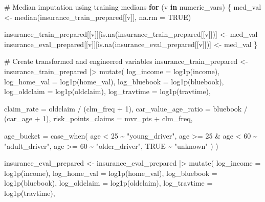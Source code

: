 \documentclass[
  11pt]{article}
\newenvironment{Shaded}{\begin{snugshade}}{\end{snugshade}}
\newcommand{\AttributeTok}[1]{\textcolor[rgb]{0.40,0.45,0.13}{#1}}
\newcommand{\CommentTok}[1]{\textcolor[rgb]{0.37,0.37,0.37}{#1}}
\newcommand{\ConstantTok}[1]{\textcolor[rgb]{0.56,0.35,0.01}{#1}}
\newcommand{\ControlFlowTok}[1]{\textcolor[rgb]{0.00,0.23,0.31}{\textbf{#1}}}
\newcommand{\DecValTok}[1]{\textcolor[rgb]{0.68,0.00,0.00}{#1}}
\newcommand{\FunctionTok}[1]{\textcolor[rgb]{0.28,0.35,0.67}{#1}}
\newcommand{\NormalTok}[1]{\textcolor[rgb]{0.00,0.23,0.31}{#1}}
\newcommand{\OtherTok}[1]{\textcolor[rgb]{0.00,0.23,0.31}{#1}}
\newcommand{\SpecialCharTok}[1]{\textcolor[rgb]{0.37,0.37,0.37}{#1}}
\newcommand{\StringTok}[1]{\textcolor[rgb]{0.13,0.47,0.30}{#1}}
\begin{document}
\begin{Shaded}
\begin{Highlighting}[]
\CommentTok{\# Median imputation using training medians}
\ControlFlowTok{for}\NormalTok{ (v }\ControlFlowTok{in}\NormalTok{ numeric\_vars) \{}
\NormalTok{  med\_val }\OtherTok{\textless{}{-}} \FunctionTok{median}\NormalTok{(insurance\_train\_prepared[[v]], }\AttributeTok{na.rm =} \ConstantTok{TRUE}\NormalTok{)}

\NormalTok{  insurance\_train\_prepared[[v]][}\FunctionTok{is.na}\NormalTok{(insurance\_train\_prepared[[v]])] }\OtherTok{\textless{}{-}}\NormalTok{ med\_val}
\NormalTok{  insurance\_eval\_prepared[[v]][}\FunctionTok{is.na}\NormalTok{(insurance\_eval\_prepared[[v]])] }\OtherTok{\textless{}{-}}\NormalTok{ med\_val}
\NormalTok{\}}

\CommentTok{\# Create transformed and engineered variables}
\NormalTok{insurance\_train\_prepared }\OtherTok{\textless{}{-}}\NormalTok{ insurance\_train\_prepared }\SpecialCharTok{|\textgreater{}}
  \FunctionTok{mutate}\NormalTok{(}
    \AttributeTok{log\_income =} \FunctionTok{log1p}\NormalTok{(income),}
    \AttributeTok{log\_home\_val =} \FunctionTok{log1p}\NormalTok{(home\_val),}
    \AttributeTok{log\_bluebook =} \FunctionTok{log1p}\NormalTok{(bluebook),}
    \AttributeTok{log\_oldclaim =} \FunctionTok{log1p}\NormalTok{(oldclaim),}
    \AttributeTok{log\_travtime =} \FunctionTok{log1p}\NormalTok{(travtime),}

    \AttributeTok{claim\_rate =}\NormalTok{ oldclaim }\SpecialCharTok{/}\NormalTok{ (clm\_freq }\SpecialCharTok{+} \DecValTok{1}\NormalTok{),}
    \AttributeTok{car\_value\_age\_ratio =}\NormalTok{ bluebook }\SpecialCharTok{/}\NormalTok{ (car\_age }\SpecialCharTok{+} \DecValTok{1}\NormalTok{),}
    \AttributeTok{risk\_points\_claims =}\NormalTok{ mvr\_pts }\SpecialCharTok{+}\NormalTok{ clm\_freq,}

    \AttributeTok{age\_bucket =} \FunctionTok{case\_when}\NormalTok{(}
\NormalTok{      age }\SpecialCharTok{\textless{}} \DecValTok{25} \SpecialCharTok{\textasciitilde{}} \StringTok{"young\_driver"}\NormalTok{,}
\NormalTok{      age }\SpecialCharTok{\textgreater{}=} \DecValTok{25} \SpecialCharTok{\&}\NormalTok{ age }\SpecialCharTok{\textless{}} \DecValTok{60} \SpecialCharTok{\textasciitilde{}} \StringTok{"adult\_driver"}\NormalTok{,}
\NormalTok{      age }\SpecialCharTok{\textgreater{}=} \DecValTok{60} \SpecialCharTok{\textasciitilde{}} \StringTok{"older\_driver"}\NormalTok{,}
      \ConstantTok{TRUE} \SpecialCharTok{\textasciitilde{}} \StringTok{"unknown"}
\NormalTok{    )}
\NormalTok{  )}

\NormalTok{insurance\_eval\_prepared }\OtherTok{\textless{}{-}}\NormalTok{ insurance\_eval\_prepared }\SpecialCharTok{|\textgreater{}}
  \FunctionTok{mutate}\NormalTok{(}
    \AttributeTok{log\_income =} \FunctionTok{log1p}\NormalTok{(income),}
    \AttributeTok{log\_home\_val =} \FunctionTok{log1p}\NormalTok{(home\_val),}
    \AttributeTok{log\_bluebook =} \FunctionTok{log1p}\NormalTok{(bluebook),}
    \AttributeTok{log\_oldclaim =} \FunctionTok{log1p}\NormalTok{(oldclaim),}
    \AttributeTok{log\_travtime =} \FunctionTok{log1p}\NormalTok{(travtime),}


\end{Highlighting}
\end{Shaded}
\end{document}
